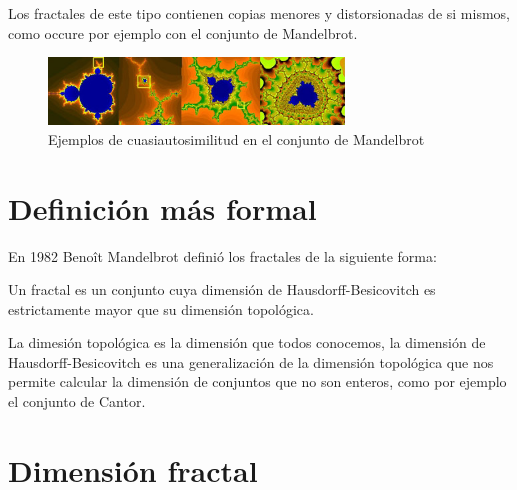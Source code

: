 \noindent
Los fractales de este tipo contienen copias menores y distorsionadas de si mismos, como occure por ejemplo con el conjunto de Mandelbrot.

\begin{figure}[H]
    \centering
    \includegraphics[width=0.7\textwidth]{figures/mandelbrot-cuasi.png}
    \caption{Ejemplos de cuasiautosimilitud en el conjunto de Mandelbrot}
\end{figure}


\section{Definición más formal}

\noindent En 1982 Benoît Mandelbrot definió los fractales de la siguiente forma:

\begin{definition}
Un fractal es un conjunto cuya dimensión de Hausdorff-Besicovitch es estrictamente mayor que su dimensión topológica.
\end{definition}

\noindent La dimesión topológica es la dimensión que todos conocemos, la dimensión de Hausdorff-Besicovitch es una generalización de la dimensión topológica que nos permite calcular la dimensión de conjuntos que no son enteros, como por ejemplo el conjunto de Cantor.

\section{Dimensión fractal}